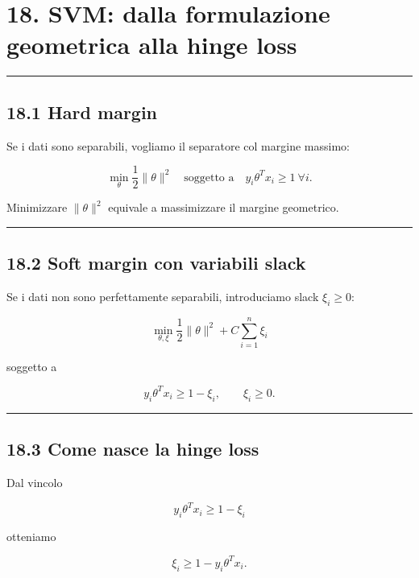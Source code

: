 \documentclass{article}
\begin{document}
\section{18. SVM: dalla formulazione geometrica alla hinge
loss}\label{svm-dalla-formulazione-geometrica-alla-hinge-loss}

\begin{center}\rule{0.5\linewidth}{0.5pt}\end{center}

\subsection{18.1 Hard margin}\label{hard-margin}

Se i dati sono separabili, vogliamo il separatore col margine massimo:

\[
\min_\theta \frac{1}{2}\|\theta\|^2
\quad\text{soggetto a}\quad
y_i\theta^Tx_i \ge 1 \ \forall i.
\]

Minimizzare \(\|\theta\|^2\) equivale a massimizzare il margine
geometrico.

\begin{center}\rule{0.5\linewidth}{0.5pt}\end{center}

\subsection{18.2 Soft margin con variabili
slack}\label{soft-margin-con-variabili-slack}

Se i dati non sono perfettamente separabili, introduciamo slack
\(\xi_i\ge 0\):

\[
\min_{\theta,\xi}
\frac{1}{2}\|\theta\|^2 + C\sum_{i=1}^n \xi_i
\]

soggetto a

\[
y_i\theta^Tx_i \ge 1-\xi_i,
\qquad
\xi_i\ge 0.
\]

\begin{center}\rule{0.5\linewidth}{0.5pt}\end{center}

\subsection{18.3 Come nasce la hinge
loss}\label{come-nasce-la-hinge-loss}

Dal vincolo

\[
y_i\theta^Tx_i \ge 1-\xi_i
\]

otteniamo

\[
\xi_i \ge 1-y_i\theta^Tx_i.
\]
\end{document}
